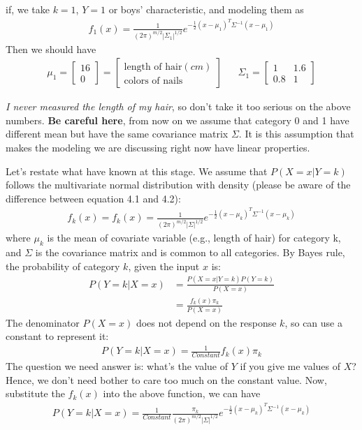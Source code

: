 \documentclass[12pt]{article}
\theoremstyle{definition}
\numberwithin{equation}{section}
\numberwithin{figure}{section}
\numberwithin{table}{section}
\begin{document}
if, we take $k=1$, $Y =1$ or boys' characteristic, and modeling them as
\begin{align*}
	f_1(x) = \frac{1}{(2\pi)^{m/2}|\Sigma_1|^{1/2}}	e^{-\frac{1}{2} (x - \mu_1)^T \Sigma^{-1}(x - \mu_1) }
\end{align*}
Then we should have 
\begin{align*}
	\mu_1 = \begin{bmatrix}
		16 \\
		0
	\end{bmatrix} = \begin{bmatrix}
		\text{length of hair}(cm)\\
		\text{colors of nails}
	\end{bmatrix} & & \Sigma_1 = \begin{bmatrix}
		1 & 1.6 \\
		0.8 & 1
	\end{bmatrix}
\end{align*}

\textit{I never measured the length of my hair}, so don't take it too serious on the above numbers. \textbf{Be careful here}, from now on we assume that category 0 and 1 have different mean but have the same covariance matrix $\Sigma$. It is this assumption that makes the modeling we are discussing right now have linear properties. 

Let's restate what have known at this stage. We assume that $P(X = x|Y =k)$ follows the multivariate normal distribution with density (please be aware of the difference between equation 4.1 and 4.2):
\begin{align}
	f_k(x) = f_k(x) = \frac{1}{(2\pi)^{m/2}|\Sigma|^{1/2}}	e^{-\frac{1}{2} (x - \mu_k)^T \Sigma^{-1}(x - \mu_k) }
\end{align}
where $\mu_k$ is the mean of covariate variable (e.g., length of hair) for category k, and $\Sigma$ is the covariance matrix and is common to all categories. By Bayes rule, the probability of category $k$, given the input $x$ is:
\begin{align*}
	P(Y=k|X = x) & = \frac{P(X =x| Y = k) P(Y=k)}{P(X=x)} \\
	& = \frac{f_k(x) \pi_k}{P(X = x)}
\end{align*}
The denominator $P(X=x)$ does not depend on the response $k$, so can use a constant to represent it:
\begin{align*}
	P(Y=k |X = x) = \frac{1}{Constant} f_k(x) \pi_k
\end{align*}
The question we need answer is: what's the value of $Y$ if you give me values of $X$? Hence, we don't need bother to care too much on the constant value. Now, substitute the $f_k(x)$ into the above function, we can have
\begin{align*}
	P(Y=k |X = x) = \frac{1}{Constant} \frac{\pi_k }{(2\pi)^{m/2}|\Sigma|^{1/2}}	e^{-\frac{1}{2} (x - \mu_k)^T \Sigma^{-1}(x - \mu_k) }
\end{align*}
\end{document}
